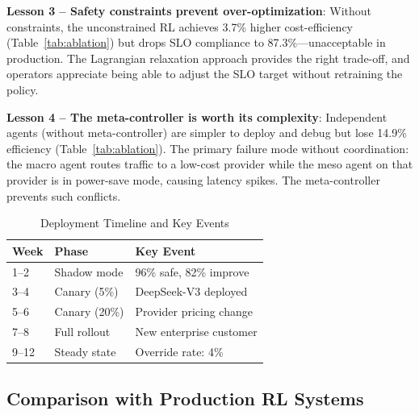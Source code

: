 \documentclass[conference,10pt]{IEEEtran}
\begin{document}
\textbf{Lesson 3 -- Safety constraints prevent over-optimization}: Without constraints, the unconstrained RL achieves 3.7\% higher cost-efficiency (Table~\ref{tab:ablation}) but drops SLO compliance to 87.3\%---unacceptable in production. The Lagrangian relaxation approach provides the right trade-off, and operators appreciate being able to adjust the SLO target without retraining the policy.

\textbf{Lesson 4 -- The meta-controller is worth its complexity}: Independent agents (without meta-controller) are simpler to deploy and debug but lose 14.9\% efficiency (Table~\ref{tab:ablation}). The primary failure mode without coordination: the macro agent routes traffic to a low-cost provider while the meso agent on that provider is in power-save mode, causing latency spikes. The meta-controller prevents such conflicts.

\begin{table}[!htbp]
\caption{Deployment Timeline and Key Events}
\label{tab:timeline}
\centering\scriptsize
\begin{tabular}{@{}lll@{}}
\toprule
\textbf{Week} & \textbf{Phase} & \textbf{Key Event} \\
\midrule
1--2 & Shadow mode & 96\% safe, 82\% improve \\
3--4 & Canary (5\%) & DeepSeek-V3 deployed \\
5--6 & Canary (20\%) & Provider pricing change \\
7--8 & Full rollout & New enterprise customer \\
9--12 & Steady state & Override rate: 4\% \\
\bottomrule
\end{tabular}
\end{table}

\subsection{Comparison with Production RL Systems}

\begin{table}[!htbp]
\caption{Comparison with Existing Production RL Systems}
\label{tab:rlcompare}
\centering\scriptsize
{}
\end{table}
\end{document}
